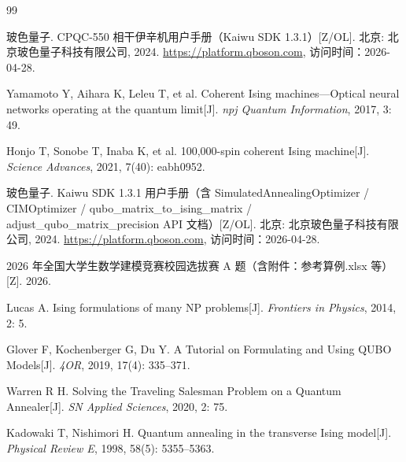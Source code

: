 \documentclass[UTF8,12pt,a4paper]{ctexart}
\begin{document}
\begin{thebibliography}{99}


玻色量子. CPQC-550 相干伊辛机用户手册（Kaiwu SDK 1.3.1）[Z/OL]. 北京: 北京玻色量子科技有限公司, 2024. \url{https://platform.qboson.com}, 访问时间：2026-04-28.

Yamamoto Y, Aihara K, Leleu T, et al. Coherent Ising machines---Optical neural networks operating at the quantum limit[J]. \emph{npj Quantum Information}, 2017, 3: 49.

Honjo T, Sonobe T, Inaba K, et al. 100,000-spin coherent Ising machine[J]. \emph{Science Advances}, 2021, 7(40): eabh0952.

玻色量子. Kaiwu SDK 1.3.1 用户手册（含 SimulatedAnnealingOptimizer / CIMOptimizer / qubo\_matrix\_to\_ising\_matrix / adjust\_qubo\_matrix\_precision API 文档）[Z/OL]. 北京: 北京玻色量子科技有限公司, 2024. \url{https://platform.qboson.com}, 访问时间：2026-04-28.

2026 年全国大学生数学建模竞赛校园选拔赛 A 题（含附件：参考算例.xlsx 等）[Z]. 2026.

Lucas A. Ising formulations of many NP problems[J]. \emph{Frontiers in Physics}, 2014, 2: 5.

Glover F, Kochenberger G, Du Y. A Tutorial on Formulating and Using QUBO Models[J]. \emph{4OR}, 2019, 17(4): 335--371.

Warren R H. Solving the Traveling Salesman Problem on a Quantum Annealer[J]. \emph{SN Applied Sciences}, 2020, 2: 75.

Kadowaki T, Nishimori H. Quantum annealing in the transverse Ising model[J]. \emph{Physical Review E}, 1998, 58(5): 5355--5363.


\end{thebibliography}
\end{document}
